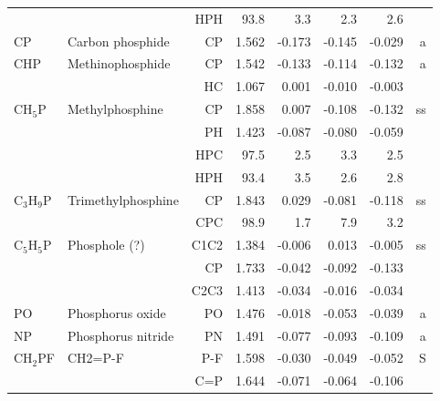 \begin{table}
\begin{center}
\begin{tabular}{llrrrrrr}
             &                                    &HPH          &      93.8   &       3.3 &       2.3 &       2.6   &       \\
 CP          & Carbon phosphide                   &CP             &     1.562   &    -0.173 &    -0.145 &    -0.029 &     a \\
 CHP         & Methinophosphide                   &CP             &     1.542   &    -0.133 &    -0.114 &    -0.132 &     a \\
             &                                    &HC             &     1.067   &     0.001 &    -0.010 &    -0.003 &       \\
 CH$_5$P        & Methylphosphine                    &CP             &     1.858   &     0.007 &    -0.108 &    -0.132 &    ss \\
             &                                    &PH             &     1.423   &    -0.087 &    -0.080 &    -0.059 &       \\
             &                                    &HPC          &      97.5   &       2.5 &       3.3 &       2.5   &       \\
             &                                    &HPH          &      93.4   &       3.5 &       2.6 &       2.8   &       \\
 C$_3$H$_9$P       & Trimethylphosphine                 &CP             &     1.843   &     0.029 &    -0.081 &    -0.118 &    ss \\
             &                                    &CPC          &      98.9   &       1.7 &       7.9 &       3.2   &       \\
 C$_5$H$_5$P       & Phosphole (?)                      &C1C2           &     1.384   &    -0.006 &     0.013 &    -0.005 &    ss \\
             &                                    &CP             &     1.733   &    -0.042 &    -0.092 &    -0.133 &       \\
             &                                    &C2C3           &     1.413   &    -0.034 &    -0.016 &    -0.034 &       \\
 PO          & Phosphorus oxide                   &PO             &     1.476   &    -0.018 &    -0.053 &    -0.039 &     a \\
 NP          & Phosphorus nitride                 &PN             &     1.491   &    -0.077 &    -0.093 &    -0.109 &     a \\
 CH$_2$PF       & CH2=P-F                            &P-F            &     1.598   &    -0.030 &    -0.049 &    -0.052 &     S \\
             &                                    &C=P            &     1.644   &    -0.071 &    -0.064 &    -0.106 &       \\
\hline
\end{tabular}
\end{center}
\end{table}
\clearpage

